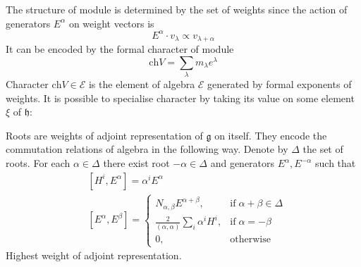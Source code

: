 \documentclass[preprint,12pt]{elsarticle}
\newcommand{\gf}{\mathfrak{g}}
\newcommand{\hf}{\mathfrak{h}}
\begin{document}
The structure of module is determined by the set of weights since the action of generators $E^{\alpha}$ on weight vectors is
\begin{equation}
  \label{eq:5}
  E^{\alpha}\cdot v_{\lambda} \propto v_{\lambda+\alpha}
\end{equation}
It can be encoded by the formal character of module
\begin{equation}
  \label{eq:10}
  \mathrm{ch}V=\sum_{\lambda}m_{\lambda} e^{\lambda}
\end{equation}
Character  $\mathrm{ch}V\in \mathcal{E}$ is the element of algebra $\mathcal{E}$ generated by formal exponents of weights.
It is possible to specialise character by taking its value on some element $\xi$ of $\hf$:

Roots are weights of adjoint representation of $\gf$ on itself. They encode the commutation relations of algebra in the following way. Denote by $\Delta$ the set of roots. For each $\alpha\in \Delta$ there exist root $-\alpha\in \Delta$ and generators $E^{\alpha}, E^{-\alpha}$ such that
\begin{align}
  \label{eq:4}
  &  [H^{i},E^{\alpha}]=\alpha^{i}E^{\alpha} \\
  &\left[E^{\alpha},E^{\beta}\right]=
  \begin{cases} 
    N_{\alpha,\beta} E^{\alpha+\beta}, & \mbox{if}\; \alpha+\beta\in \Delta\\
    \frac{2}{(\alpha,\alpha)} \sum_{i}\alpha^{i} H^{i},&  \mbox{if}\; \alpha=-\beta\\
    0,&\mbox{otherwise}
  \end{cases}
\end{align}
Highest weight of adjoint representation. 

\end{document}
